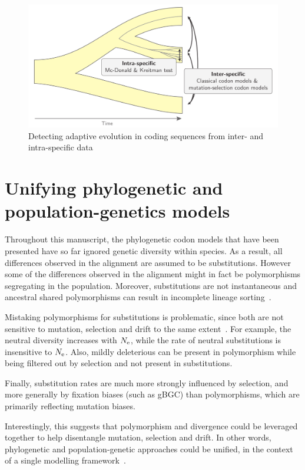 \begin{figure}[htbp]
    \centering
    \includegraphics[width=\textwidth] {figures/inter-intra}
    \caption{Detecting adaptive evolution in coding sequences from inter- and intra-specific data}
    \label{fig:detecting-adaptation-inter-intra}
\end{figure}

\section{Unifying phylogenetic and population-genetics models}
\label{sec:unifying-phylogenetic-and-population-genetics-model}

Throughout this manuscript, the phylogenetic codon models that have been presented have so far ignored genetic diversity within species.
As a result, all differences observed in the alignment are assumed to be substitutions.
However some of the differences observed in the alignment might in fact be polymorphisms segregating in the population.
Moreover, substitutions are not instantaneous and ancestral shared polymorphisms can result in incomplete lineage sorting~\citep{Charlesworth2010}.

Mistaking polymorphisms for substitutions is problematic, since both are not sensitive to mutation, selection and drift to the same extent~\citep{Mugal2014}.
For example, the neutral diversity increases with $N_{\text{e}}$, while the rate of neutral substitutions is insensitive to $N_{\text{e}}$.
Also, mildly deleterious can be present in polymorphism while being filtered out by selection and not present in substitutions.

Finally, substitution rates are much more strongly influenced by selection, and more generally by fixation biases (such as gBGC) than polymorphisms, which are primarily reflecting mutation biases.

Interestingly, this suggests that polymorphism and divergence could be leveraged together to help disentangle mutation, selection and drift.
In other words, phylogenetic and population-genetic approaches could be unified, in the context of a single modelling framework~\citep{Thorne2012}.


